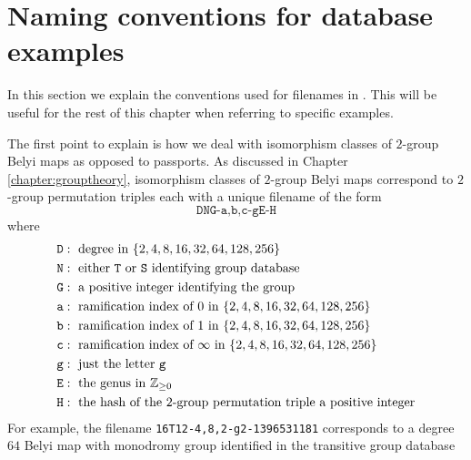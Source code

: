 \documentclass{dcthesis}
\newcommand{\ZZ}{\mathbb Z}
\numberwithin{equation}{section}
\theoremstyle{definition}
\theoremstyle{remark}
\begin{document}
{{  \section{Naming conventions for database examples}{
    \label{sec:labels}
    In this section we explain the conventions
    used for filenames in
    \cite{twogroupdessins}.
    This will be useful for the rest of
    this chapter when referring to
    specific examples.
    \par
    The first point to explain is how we deal
    with isomorphism classes of $2$-group
    Belyi maps
    as opposed to passports.
    As discussed in Chapter
    \ref{chapter:grouptheory},
    isomorphism classes of $2$-group Belyi maps
    correspond to $2$-group permutation triples
    each with a unique filename of the form
    \begin{equation}
      \label{eqn:galmapfilename}
      \texttt{DNG-a,b,c-gE-H}
    \end{equation}
    where
    \begin{align}
      \label{eqn:galmapfilenameparts}
      \begin{split}
        \texttt{D} &:\text{ degree in }
        \{2,4,8,16,32,64,128,256\}\\
        \texttt{N} &:\text{ either \texttt{T}
        or \texttt{S} identifying group
        database}\\
        \texttt{G} &:\text{ a positive integer
        identifying the group}\\
        \texttt{a} &:\text{ ramification index
        of $0$ in }
        \{2,4,8,16,32,64,128,256\}\\
        \texttt{b} &:\text{ ramification index
        of $1$ in }
        \{2,4,8,16,32,64,128,256\}\\
        \texttt{c} &:\text{ ramification index
        of $\infty$ in }
        \{2,4,8,16,32,64,128,256\}\\
        \texttt{g} &:\text{ just the letter 
        \texttt{g}}\\
        \texttt{E} &:\text{ the genus in }
        \ZZ_{\geq 0}\\
        \texttt{H} &:\text{ the hash
        of the $2$-group permutation triple 
        a positive integer}
      \end{split}
    \end{align}
    For example,
    the filename
    \texttt{16T12-4,8,2-g2-1396531181}
    corresponds to a degree $64$
    Belyi map with monodromy group
    identified in the
    transitive group database
}}}
\end{document}
